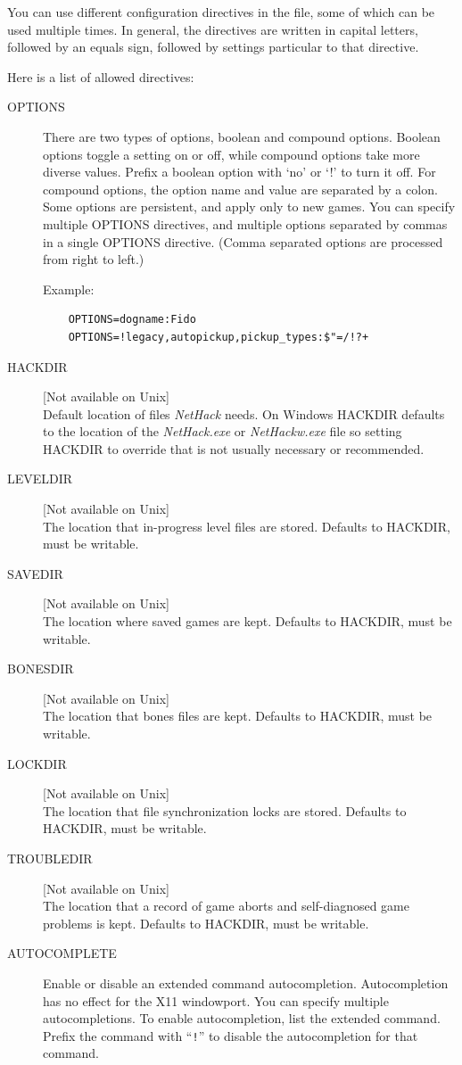 \documentclass[titlepage]{article}
\begin{document}
You can use different configuration directives in the file, some
of which can be used multiple times.
In general, the directives are
written in capital letters, followed by an equals sign, followed by
settings particular to that directive.

Here is a list of allowed directives:

\begin{description}
\item[OPTIONS]
There are two types of options, boolean and compound options.
Boolean options toggle a setting on or off, while compound options
take more diverse values.
Prefix a boolean option with `no' or `!' to turn it off.
For compound options, the option name and value are separated by a colon.
Some options are persistent, and apply only to new games.
You can specify multiple OPTIONS directives, and multiple options
separated by commas in a single OPTIONS directive.
(Comma separated options are processed from right to left.)

Example:
\begin{verbatim}
    OPTIONS=dogname:Fido
    OPTIONS=!legacy,autopickup,pickup_types:$"=/!?+
\end{verbatim}

\item[HACKDIR]
{[}Not available on Unix]\\
Default location of files \textit{NetHack} needs. On Windows HACKDIR
defaults to the location of the \textit{NetHack.exe} or \textit{NetHackw.exe} file
so setting HACKDIR to override that is not usually necessary or recommended.
\item[LEVELDIR]
{[}Not available on Unix]\\
The location that in-progress level files are stored. Defaults to HACKDIR,
must be writable.
\item[SAVEDIR]
{[}Not available on Unix]\\
The location where saved games are kept. Defaults to HACKDIR, must be
writable.
\item[BONESDIR]
{[}Not available on Unix]\\
The location that bones files are kept. Defaults to HACKDIR, must be
writable.
\item[LOCKDIR]
{[}Not available on Unix]\\
The location that file synchronization locks are stored. Defaults to
HACKDIR, must be writable.
\item[TROUBLEDIR]
{[}Not available on Unix]\\
The location that a record of game aborts and self-diagnosed game problems
is kept. Defaults to HACKDIR, must be writable.
%
%
\item[AUTOCOMPLETE]
Enable or disable an extended command autocompletion.
Autocompletion has no effect for the X11 windowport.
You can specify multiple autocompletions. To enable
autocompletion, list the extended command. Prefix the
command with ``\texttt{!}'' to disable the autocompletion
for that command.


\end{description}
\end{document}
